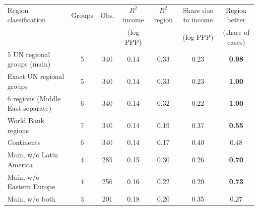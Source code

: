 \begin{tabular}{lcccccc}
\toprule
Region classification & Groups & Obs. & $R^2$ income & $R^2$ region & Share due to income & Region better \\ & & & (log PPP) & & (log PPP) & (share of cases) \\
\midrule
5 UN regional groups (main) & 5 & 340 & 0.14 & 0.33 & 0.23 & \textbf{0.98} \\
Exact UN regional groups & 5 & 340 & 0.14 & 0.33 & 0.23 & \textbf{1.00} \\
6 regions (Middle East separate) & 6 & 340 & 0.14 & 0.32 & 0.22 & \textbf{1.00} \\
World Bank regions & 7 & 340 & 0.14 & 0.19 & 0.37 & \textbf{0.55} \\
Continents & 6 & 340 & 0.14 & 0.17 & 0.40 & 0.48 \\
\midrule
Main, w/o Latin America & 4 & 285 & 0.15 & 0.30 & 0.26 & \textbf{0.70} \\
Main, w/o Eastern Europe & 4 & 256 & 0.16 & 0.22 & 0.29 & \textbf{0.73} \\
Main, w/o both & 3 & 201 & 0.18 & 0.20 & 0.35 & 0.27 \\
\bottomrule
\end{tabular}
